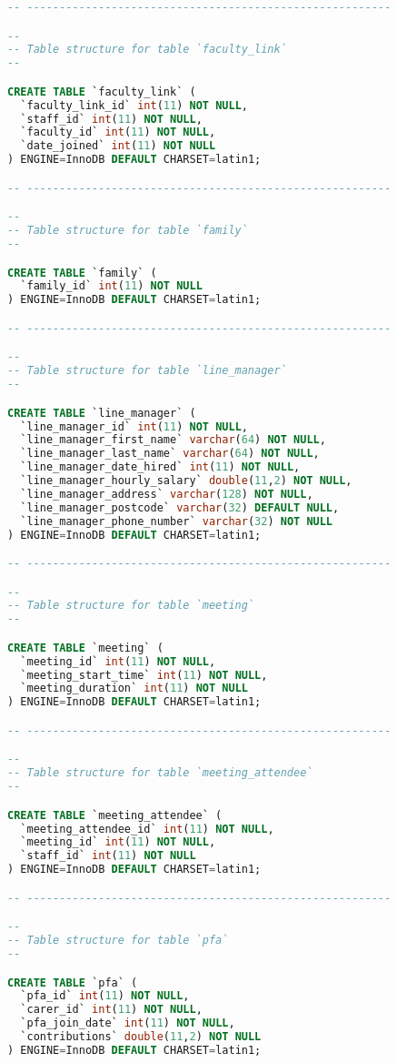 \begin{lstlisting}[language=sql, caption=Database Generation Script, style=mystyle]
-- --------------------------------------------------------

--
-- Table structure for table `faculty_link`
--

CREATE TABLE `faculty_link` (
  `faculty_link_id` int(11) NOT NULL,
  `staff_id` int(11) NOT NULL,
  `faculty_id` int(11) NOT NULL,
  `date_joined` int(11) NOT NULL
) ENGINE=InnoDB DEFAULT CHARSET=latin1;

-- --------------------------------------------------------

--
-- Table structure for table `family`
--

CREATE TABLE `family` (
  `family_id` int(11) NOT NULL
) ENGINE=InnoDB DEFAULT CHARSET=latin1;

-- --------------------------------------------------------

--
-- Table structure for table `line_manager`
--

CREATE TABLE `line_manager` (
  `line_manager_id` int(11) NOT NULL,
  `line_manager_first_name` varchar(64) NOT NULL,
  `line_manager_last_name` varchar(64) NOT NULL,
  `line_manager_date_hired` int(11) NOT NULL,
  `line_manager_hourly_salary` double(11,2) NOT NULL,
  `line_manager_address` varchar(128) NOT NULL,
  `line_manager_postcode` varchar(32) DEFAULT NULL,
  `line_manager_phone_number` varchar(32) NOT NULL
) ENGINE=InnoDB DEFAULT CHARSET=latin1;

-- --------------------------------------------------------

--
-- Table structure for table `meeting`
--

CREATE TABLE `meeting` (
  `meeting_id` int(11) NOT NULL,
  `meeting_start_time` int(11) NOT NULL,
  `meeting_duration` int(11) NOT NULL
) ENGINE=InnoDB DEFAULT CHARSET=latin1;

-- --------------------------------------------------------

--
-- Table structure for table `meeting_attendee`
--

CREATE TABLE `meeting_attendee` (
  `meeting_attendee_id` int(11) NOT NULL,
  `meeting_id` int(11) NOT NULL,
  `staff_id` int(11) NOT NULL
) ENGINE=InnoDB DEFAULT CHARSET=latin1;

-- --------------------------------------------------------

--
-- Table structure for table `pfa`
--

CREATE TABLE `pfa` (
  `pfa_id` int(11) NOT NULL,
  `carer_id` int(11) NOT NULL,
  `pfa_join_date` int(11) NOT NULL,
  `contributions` double(11,2) NOT NULL
) ENGINE=InnoDB DEFAULT CHARSET=latin1;


\end{lstlisting}
